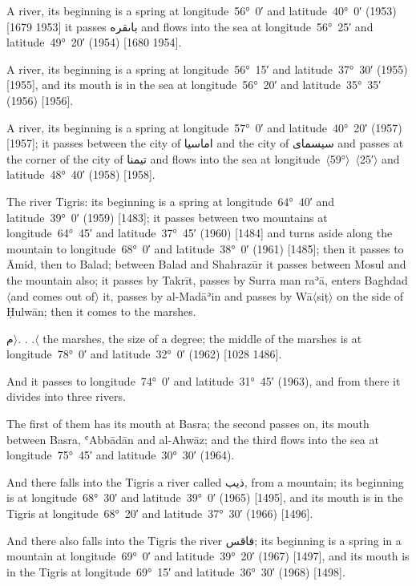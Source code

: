 \documentclass[11pt]{article}
\newcommand{\Pg}[1]{\marginpar{\footnotesize #1}}
\newcommand{\Ang}[1]{\ensuremath{#1}}
\newcommand{\AngOpen}{\ensuremath{\rangle}}
\newcommand{\AngClose}{\ensuremath{\langle}}
\begin{document}
A river, its beginning is a spring at longitude~56°~0′ and latitude~40°~0′ (1953) [1679 1953] it passes \textarabic{باٮقره} and flows into the sea at longitude~56°~25′ and latitude~49°~20′ (1954) [1680 1954].

A river, its beginning is a spring at longitude~56°~15′ and latitude~37°~30′ (1955) [1955], and its mouth is in the sea at longitude~56°~20′ and latitude~35°~35′ (1956) [1956].

A river, its beginning is a spring at longitude~57°~0′ and latitude~40°~20′ (1957) [1957]; it passes between the city of \textarabic{اماسيا} and the city of \textarabic{سيسماى} and passes at the corner of the city of \textarabic{تيمنا} and flows into the sea at longitude~\Ang{\langle}59°\Ang{\rangle}~\Ang{\langle}25′\Ang{\rangle} and latitude~48°~40′ (1958) [1958].

The river Tigris: its beginning is a spring at longitude~64°~40′ and latitude~39°~0′ (1959) [1483]; it passes between two mountains at longitude~64°~45′ and latitude~37°~45′ (1960) [1484] and turns aside along the mountain to longitude~68°~0′ and latitude~38°~0′ (1961) [1485]\Pg{p. 130}; then it passes to Āmid, then to Balad; between Balad and Shahrazūr it passes between Mosul and the mountain also; it passes by Takrīt, passes by Surra man raʾā, enters Baghdad \Ang{\langle}and comes out of\Ang{\rangle} it, passes by al-Madāʾin and passes by Wā\Ang{\langle}siṭ\Ang{\rangle} on the side of Ḥulwān; then it comes to the marshes.

\textarabic{م\AngOpen{}. . .\AngClose{}} the marshes, the size of a degree; the middle of the marshes is at longitude~78°~0′ and latitude~32°~0′ (1962) [1028 1486].

And it passes to longitude~74°~0′ and latitude~31°~45′ (1963), and from there it divides into three rivers.

The first of them has its mouth at Basra; the second passes on, its mouth between Basra, ʿAbbādān and al-Ahwāz; and the third flows into the sea at longitude~75°~45′ and latitude~30°~30′ (1964).

And there falls into the Tigris a river called \textarabic{ذيب}, from a mountain; its beginning is at longitude~68°~30′ and latitude~39°~0′ (1965) [1495], and its mouth is in the Tigris at longitude~68°~20′ and latitude~37°~30′ (1966) [1496].

And there also falls into the Tigris the river \textarabic{فاقس}; its beginning is a spring in a mountain at longitude~69°~0′ and latitude~39°~20′ (1967) [1497], and its mouth is in the Tigris at longitude~69°~15′ and latitude~36°~30′ (1968) [1498].
\end{document}
